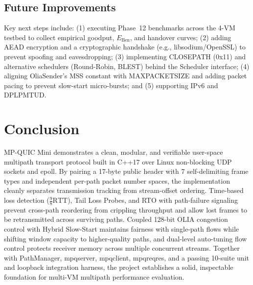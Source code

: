\documentclass[10pt,a4paper]{article}
\newcommand{\codeul}{\textunderscore\hspace{0pt}}
\DeclareRobustCommand{\code}[1]{{\ttfamily\let\_\codeul #1}}
\begin{document}
\subsection{Future Improvements}
Key next steps include: (1) executing Phase~12 benchmarks across the 4-VM testbed to collect empirical goodput, $E_{\text{Ben}}$, and handover curves; (2) adding AEAD encryption and a cryptographic handshake (e.g., libsodium/OpenSSL) to prevent spoofing and eavesdropping; (3) implementing \code{CLOSE\_PATH} (\code{0x11}) and alternative schedulers (Round-Robin, BLEST) behind the \code{Scheduler} interface; (4) aligning \code{OliaSender}'s MSS constant with \code{MAX\_PACKET\_SIZE} and adding packet pacing to prevent slow-start micro-bursts; and (5) supporting IPv6 and DPLPMTUD.

\section{Conclusion}

MP-QUIC Mini demonstrates a clean, modular, and verifiable user-space multipath transport protocol built in C++17 over Linux non-blocking UDP sockets and \code{epoll}. By pairing a 17-byte public header with 7 self-delimiting frame types and independent per-path packet number spaces, the implementation cleanly separates transmission tracking from stream-offset ordering. Time-based loss detection ($\frac{9}{8}\text{RTT}$), Tail Loss Probes, and RTO with path-failure signaling prevent cross-path reordering from crippling throughput and allow lost frames to be retransmitted across surviving paths. Coupled 128-bit OLIA congestion control with Hybrid Slow-Start maintains fairness with single-path flows while shifting window capacity to higher-quality paths, and dual-level auto-tuning flow control protects receiver memory across multiple concurrent streams. Together with \code{PathManager}, \code{mpq\_server}, \code{mpq\_client}, \code{mpq\_reqres}, and a passing 10-suite unit and loopback integration harness, the project establishes a solid, inspectable foundation for multi-VM multipath performance evaluation.
\end{document}
